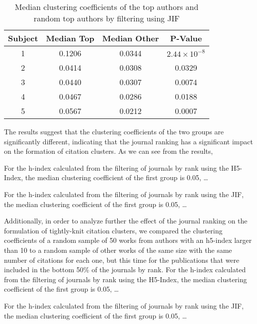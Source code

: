 \begin{table}[H]
\centering
\begin{tabular}{|c|c|c|c|}
    \hline
    \textbf{Subject} & \textbf{Median Top} & \textbf{Median Other} & \textbf{P-Value}      \\ \hline
    1                & 0.1206              & 0.0344                & $2.44 \times 10^{-8}$ \\ \hline
    2                & 0.0414              & 0.0308                & 0.0329                \\ \hline
    3                & 0.0440              & 0.0307                & 0.0074                \\ \hline
    4                & 0.0467              & 0.0286                & 0.0188                \\ \hline
    5                & 0.0567              & 0.0212                & 0.0007                \\ \hline
\end{tabular}
\caption{Median clustering coefficients of the top authors and random top authors by filtering using JIF}
\label{tab:clustering}

The results suggest that the clustering coefficients of the two groups are
significantly different, indicating that the journal ranking has a significant
impact on the formation of citation clusters. As we can see from the results,






For the h-index calculated from the filtering of journals by rank using the
H5-Index, the median clustering coefficient of the first group is 0.05, \dots

For the h-index calculated from the filtering of journals by rank using the
JIF, the median clustering coefficient of the first group is 0.05, \dots

Additionally, in order to analyze further the effect of the journal ranking on
the formulation of tightly-knit citation clusters, we compared the clustering
coefficients of a random sample of 50 works from authors with an h5-index
larger than 10 to a random sample of other works of the same size with the same
number of citations for each one, but this time for the publications that were
included in the bottom 50\% of the journals by rank. For the h-index calculated
from the filtering of journals by rank using the H5-Index, the median
clustering coefficient of the first group is 0.05, \dots

For the h-index calculated from the filtering of journals by rank using the
JIF, the median clustering coefficient of the first group is 0.05, \dots


\end{table}
